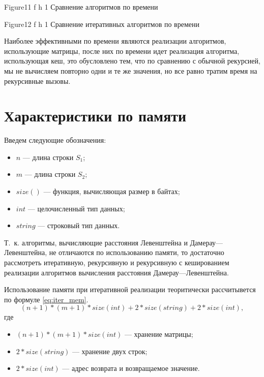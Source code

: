 {Figure11} %
{f} %
{h} %
{1\textwidth} %
{Сравнение алгоритмов по времени} %

{Figure12} %
{f} %
{h} %
{1\textwidth} %
{Сравнение итеративных алгоритмов по времени} %

\clearpage

Наиболее эффективными по времени являются реализации алгоритмов, использующие матрицы, после них по времени идет реализация алгоритма, использующая кеш, это обусловлено тем, что по сравнению с обычной рекурсией, мы не вычисляем повторно одни и те же значения, но все равно тратим время на рекурсивные вызовы. 

\section{Характеристики по памяти}

\label{memory}

Введем следующие обозначения:
\begin{itemize}
	\item $n$ --- длина строки $S_1$;
	\item $m$ --- длина строки $S_2$;
	\item $size()$ --- функция, вычисляющая размер в байтах;
	\item $int$ --- целочисленный тип данных;
	\item $string$ --- строковый тип данных.
\end{itemize}

Т.~к. алгоритмы, вычисляющие расстояния Левенштейна и Дамерау---Левенштейна, не отличаются по использованию памяти, то достаточно рассмотреть итеративную, рекурсивную и рекурсивную с кешированием реализации алгоритмов вычисления расстояния Дамерау---Левенштейна.


Использование памяти при итеративной реализации теоритически рассчитывется по формуле \eqref{eq:iter_mem}.
\begin{equation}
	\label{eq:iter_mem}
	(n + 1) * (m + 1) * size(int) + 2 * size(string) + 2 * size(int),
\end{equation}
где 
\begin{itemize}
	\item $ (n + 1) * (m + 1) * size(int) $ --- хранение матрицы;
	\item $ 2 * size(string) $ --- хранение двух строк;
	\item $ 2 * size(int) $ --- адрес возврата и возвращаемое значение.
\end{itemize}


